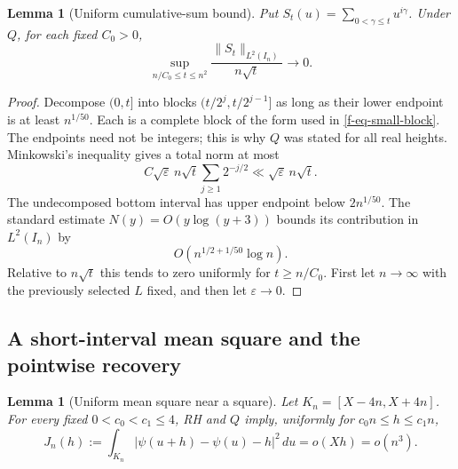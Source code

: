 \documentclass[11pt,a4paper]{article}
\newtheorem{lemma}[theorem]{Lemma}
\theoremstyle{definition}
\theoremstyle{remark}
\begin{document}
\begin{lemma}[Uniform cumulative-sum bound]
\label{f-lem-cumulative}
Put $S_t(u)=\sum_{0<\gamma\le t}u^{i\gamma}$.  Under $Q$, for each fixed
$C_0>0$,
\begin{equation}
 \sup_{n/C_0\le t\le n^2}
 \frac{\|S_t\|_{L^2(I_n)}}{n\sqrt t}\longrightarrow0.
 \label{f-eq-cumulative}
\end{equation}
\end{lemma}

\begin{proof}
Decompose $(0,t]$ into blocks
$(t/2^j,t/2^{j-1}]$ as long as their lower endpoint is at least
$n^{1/50}$.  Each is a complete block of the form used in
\eqref{f-eq-small-block}.  The endpoints need not be integers; this is why
$Q$ was stated for all real heights.  Minkowski's inequality gives a total
norm at most
\[
 C\sqrt\varepsilon\,n\sqrt t
 \sum_{j\ge1}2^{-j/2}\ll\sqrt\varepsilon\,n\sqrt t.
\]
The undecomposed bottom interval has upper endpoint below $2n^{1/50}$.
The standard estimate $N(y)=O(y\log(y+3))$ bounds its contribution in
$L^2(I_n)$ by
\[
 O\!\left(n^{1/2+1/50}\log n\right).
\]
Relative to $n\sqrt t$ this tends to zero uniformly for $t\ge n/C_0$.
First let $n\to\infty$ with the previously selected $L$ fixed, and then
let $\varepsilon\to0$.
\end{proof}

\subsection{A short-interval mean square and the pointwise recovery}
\label{f-sub-short-interval-proof}

\begin{lemma}[Uniform mean square near a square]
\label{f-lem-mean-square}
Let $K_n=[X-4n,X+4n]$.  For every fixed $0<c_0<c_1\le4$, RH and $Q$
imply, uniformly for $c_0n\le h\le c_1n$,
\begin{equation}
 J_n(h):=\int_{K_n}
 |\psi(u+h)-\psi(u)-h|^2\,du=o(Xh)=o(n^3).
 \label{f-eq-j-small}
\end{equation}
\end{lemma}
\end{document}
